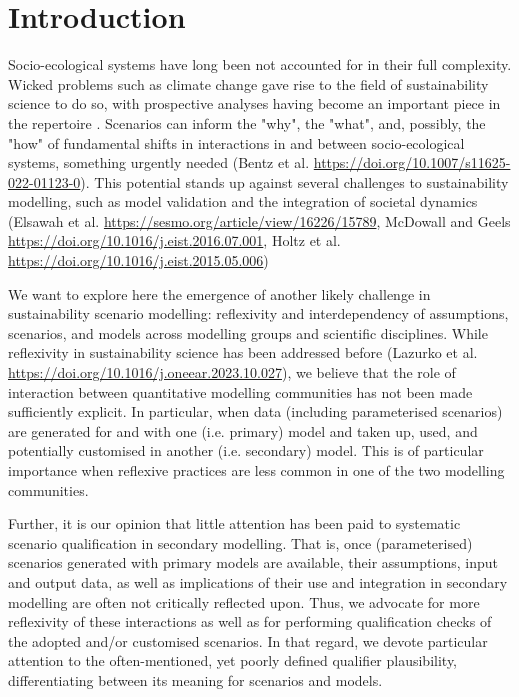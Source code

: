 \documentclass{article}
\begin{document}
\begin{refsection}

\label{intro}
\section{Introduction}
Socio-ecological systems have long been not accounted for in their full complexity. 
Wicked problems such as climate change gave rise to the field of sustainability science to do so, with prospective analyses having become an important piece in the repertoire \parencite{swart_2004}. 
Scenarios can inform the "why", the "what", and, possibly, the "how" of fundamental shifts in interactions in and between socio-ecological systems, something urgently needed (Bentz et al. \url{https://doi.org/10.1007/s11625-022-01123-0}). 
This potential stands up against several challenges to sustainability modelling, such as model validation and the integration of societal dynamics (Elsawah et al. \url{https://sesmo.org/article/view/16226/15789}, McDowall and Geels \url{https://doi.org/10.1016/j.eist.2016.07.001}, Holtz et al. \url{https://doi.org/10.1016/j.eist.2015.05.006})

We want to explore here the emergence of another likely challenge in sustainability scenario modelling: reflexivity and interdependency of assumptions, scenarios, and models across modelling groups and scientific disciplines. 
While reflexivity in sustainability science has been addressed before (Lazurko et al. \url{https://doi.org/10.1016/j.oneear.2023.10.027}), we believe that the role of interaction between quantitative modelling communities has not been made sufficiently explicit. 
In particular, when data (including parameterised scenarios) are generated for and with one (i.e. primary) model and taken up, used, and potentially customised in another (i.e. secondary) model. 
This is of particular importance when reflexive practices are less common in one of the two modelling communities. 

Further, it is our opinion that little attention has been paid to systematic scenario qualification in secondary modelling. 
That is, once (parameterised) scenarios generated with primary models are available, their assumptions, input and output data, as well as implications of their use and integration in secondary modelling are often not critically reflected upon.
Thus, we advocate for more reflexivity of these interactions as well as for performing qualification checks of the adopted and/or customised scenarios. 
In that regard, we devote particular attention to the often-mentioned, yet poorly defined qualifier plausibility, differentiating between its meaning for scenarios and models.


\end{refsection}
\end{document}
